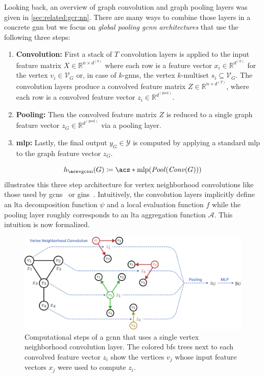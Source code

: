 Looking back, an overview of graph convolution and graph pooling layers was given in \cref{sec:related:gcr:nn}.
There are many ways to combine those layers in a concrete \ac{gnn} but we focus on \textit{global pooling \ac{gcnn} architectures} that use the following three steps:
\begin{enumerate}[label=\textbf{\arabic*.}]
	\item \textbf{Convolution:}
		First a stack of $T$ convolution layers is applied to the input feature matrix $X \in \mathbb{R}^{n \times d^{(0)}}$ where each row is a feature vector $x_i \in \mathbb{R}^{d^{(0)}}$ for the vertex $v_i \in \mathcal{V}_G$ or, in case of $k$-\acsp{gnn}, the vertex $k$-multiset $s_i \subseteq \mathcal{V}_G$.
		The convolution layers produce a convolved feature matrix $Z \in \mathbb{R}^{n \times d^{(T)}}$, where each row is a convolved feature vector $z_i \in \mathbb{R}^{d^{(\mathrm{pool})}}$.
	\item \textbf{Pooling:}
		Then the convolved feature matrix $Z$ is reduced to a single graph feature vector $z_G \in \mathbb{R}^{d^{(\mathrm{pool})}}$ via a pooling layer.
	\item \textbf{\ac{mlp}:}
		Lastly, the final output $y_G \in \mathcal{Y}$ is computed by applying a standard \ac{mlp} to the graph feature vector $z_G$.
\end{enumerate}
\[
	h_{\mathrm{\acs*{gcnn}}}(G) \coloneqq \mathrm{\acs*{mlp}}(\mathit{Pool}(\mathit{Conv}(G)))
\]
 illustrates this three step architecture for vertex neighborhood convolutions like those used by \acp{gcn}~\cite{Kipf2017} or \acp{gin}~\cite{Xu2018}.
Intuitively, the convolution layers implicitly define an \ac{lta} decomposition function $\psi$ and a local evaluation function $f$ while the pooling layer roughly corresponds to an \ac{lta} aggregation function $\mathcal{A}$.
This intuition is now formalized.
\begin{figure}[ht]
	\centering
	\includegraphics[width=\linewidth]{gfx/graph-lta/gcnn-structure.pdf}
	\caption[Computational steps of a \ac{gcnn} that uses a single vertex neighborhood convolution layer.]{
		Computational steps of a \ac{gcnn} that uses a single vertex neighborhood convolution layer.
		The colored \ac{bfs} trees next to each convolved feature vector $z_i$ show the vertices $v_j$ whose input feature vectors $x_j$ were used to compute $z_i$.
	}\label{fig:ltag:gcnn-structure}
\end{figure}

